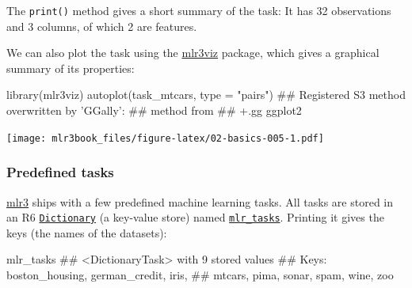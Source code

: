 \documentclass[]{article}
\newenvironment{Shaded}{}{}
\newcommand{\DataTypeTok}[1]{#1}
\newcommand{\KeywordTok}[1]{\textcolor[rgb]{0.00,0.00,1.00}{#1}}
\newcommand{\NormalTok}[1]{#1}
\newcommand{\OperatorTok}[1]{#1}
\newcommand{\StringTok}[1]{\textcolor[rgb]{0.00,0.50,0.50}{#1}}
\renewenvironment{Shaded} {\begin{snugshade}\small} {\end{snugshade}}
\begin{document}
\begin{Shaded}
\end{Shaded}

The \texttt{print()} method gives a short summary of the task:
It has 32 observations and 3 columns, of which 2 are features.

We can also plot the task using the \href{https://mlr3viz.mlr-org.com}{mlr3viz} package, which gives a graphical summary of its properties:

\begin{Shaded}
\begin{Highlighting}[]
\KeywordTok{library}\NormalTok{(mlr3viz)}
\KeywordTok{autoplot}\NormalTok{(task_mtcars, }\DataTypeTok{type =} \StringTok{"pairs"}\NormalTok{)}
\NormalTok{## Registered S3 method overwritten by 'GGally':}
\NormalTok{##   method from   }
\NormalTok{##   +.gg   ggplot2}
\end{Highlighting}
\end{Shaded}

\texttt{[image: mlr3book\_files/figure-latex/02-basics-005-1.pdf]}

\hypertarget{tasks-predefined}{%
\subsubsection{Predefined tasks}\label{tasks-predefined}}

\href{https://mlr3.mlr-org.com}{mlr3} ships with a few predefined machine learning tasks.
All tasks are stored in an R6 \href{https://mlr3misc.mlr-org.com/reference/Dictionary.html}{\texttt{Dictionary}} (a key-value store) named \href{https://mlr3.mlr-org.com/reference/mlr_tasks.html}{\texttt{mlr\_tasks}}.
Printing it gives the keys (the names of the datasets):

\begin{Shaded}
\begin{Highlighting}[]
\NormalTok{mlr_tasks}
\NormalTok{## <DictionaryTask> with 9 stored values}
\NormalTok{## Keys: boston_housing, german_credit, iris,}
\NormalTok{##   mtcars, pima, sonar, spam, wine, zoo}
\end{Highlighting}
\end{Shaded}
\end{document}
